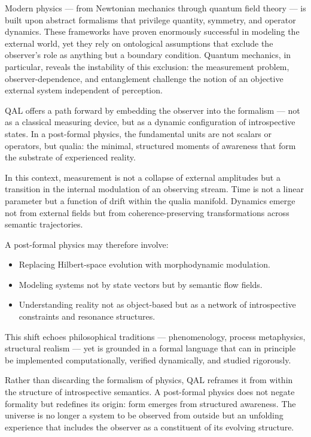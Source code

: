 \documentclass[11pt]{article}
\numberwithin{equation}{section} %
\begin{document}
Modern physics — from Newtonian mechanics through quantum field theory — is built upon abstract formalisms that privilege quantity, symmetry, and operator dynamics. These frameworks have proven enormously successful in modeling the external world, yet they rely on ontological assumptions that exclude the observer's role as anything but a boundary condition. Quantum mechanics, in particular, reveals the instability of this exclusion: the measurement problem, observer-dependence, and entanglement challenge the notion of an objective external system independent of perception.

QAL offers a path forward by embedding the observer into the formalism — not as a classical measuring device, but as a dynamic configuration of introspective states. In a post-formal physics, the fundamental units are not scalars or operators, but qualia: the minimal, structured moments of awareness that form the substrate of experienced reality.

In this context, measurement is not a collapse of external amplitudes but a transition in the internal modulation of an observing stream. Time is not a linear parameter but a function of drift within the qualia manifold. Dynamics emerge not from external fields but from coherence-preserving transformations across semantic trajectories.


A post-formal physics may therefore involve:
\begin{itemize}
\item Replacing Hilbert-space evolution with morphodynamic modulation.
\item Modeling systems not by state vectors but by semantic flow fields.
\item Understanding reality not as object-based but as a network of introspective constraints and resonance structures.
\end{itemize}

This shift echoes philosophical traditions — phenomenology, process metaphysics, structural realism — yet is grounded in a formal language that can in principle be implemented computationally, verified dynamically, and studied rigorously.

Rather than discarding the formalism of physics, QAL reframes it from within the structure of introspective semantics. A post-formal physics does not negate formality but redefines its origin: form emerges from structured awareness. The universe is no longer a system to be observed from outside but an unfolding experience that includes the observer as a constituent of its evolving structure.
\end{document}
